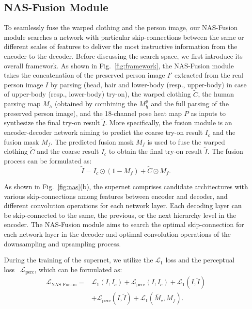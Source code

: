 \documentclass[sigconf]{acmart}
\begin{document}
\subsection{NAS-Fusion Module}\label{nas-label}
To seamlessly fuse the warped clothing and the person image,
our NAS-Fusion module searches a network with particular skip-connections between the same or different scales of features to deliver the most instructive information from the encoder to the decoder. 
Before discussing the search space, we first introduce its overall framework. 
As shown in Fig.~\ref{fig:framework}, the NAS-Fusion module takes the concatenation of the preserved person image $I'$ extracted from the real person image $I$ by parsing (head, hair and lower-body (resp., upper-body) in case of upper-body (resp., lower-body) try-on), the warped clothing $\widetilde{C}$, the human parsing map $M_h$ (obtained by combining the $M_h^p$ and the full parsing of the preserved person image), and the 18-channel pose heat map $P$ as inputs to synthesize the final try-on result $\widetilde{I}$. 
More specifically, the fusion module is an encoder-decoder network
aiming to predict the coarse try-on result $I_c$ and the fusion mask $M_f$.
The predicted fusion mask $M_f$ is used to fuse the warped clothing $\widetilde{C}$ and the coarse result $I_c$ to obtain the final try-on result $\widetilde{I}$. The fusion process can be formulated as:
\begin{equation}
    \widetilde{I} = I_c \odot (1-M_f) + \widetilde{C} \odot M_f.
\end{equation}

As shown in Fig.~\ref{fig:nas}(b), the supernet comprises candidate architectures with various skip-connections among features between encoder and decoder, and different convolution operations for each network layer. 
Each decoding layer can be skip-connected to the same, the previous, or the next hierarchy level in the encoder. The NAS-Fusion module aims to search the optimal skip-connection for each network layer in the decoder and optimal convolution operations of the downsampling and upsampling process. 

During the training of the supernet, we utilize the $\mathcal{L}_1$ loss and the perceptual loss~\cite{johnson2016perceptual} $\mathcal{L}_{\text{perc}}$, which can be formulated as:
\begin{equation}
\begin{split}
    \mathcal{L}_{\text{NAS-Fusion}} = &\mathcal{L}_1(I,I_c)+\mathcal{L}_{\text{perc}}(I,I_c)+\mathcal{L}_1(I,\widetilde{I}) \\
    &+\mathcal{L}_{\text{perc}}(I,\widetilde{I})+\mathcal{L}_1(\widetilde{M_c}, M_f).
\end{split}
\end{equation}
\end{document}
